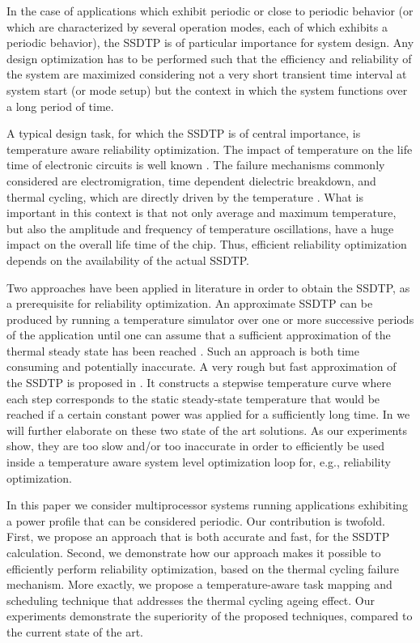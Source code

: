 In the case of applications which exhibit periodic or close to periodic behavior (or which are characterized by several operation modes, each of which exhibits a periodic behavior), the SSDTP is of particular importance for system design. Any design optimization has to be performed such that the efficiency and reliability of the system are maximized considering not a very short transient time interval at system start (or mode setup) but the context in which the system functions over a long period of time.

A typical design task, for which the SSDTP is of central importance, is temperature aware reliability optimization. The impact of temperature on the life time of electronic circuits is well known \cite{lu2004, srinivasan2004, coskun2006, xiang2010, jedec2010, hieu2004}. The failure mechanisms commonly considered are electromigration, time dependent dielectric breakdown, and thermal cycling, which are directly driven by the temperature \cite{jedec2010}. What is important in this context is that not only average and maximum temperature, but also the amplitude and frequency of temperature oscillations, have a huge impact on the overall life time of the chip. Thus, efficient reliability optimization depends on the availability of the actual SSDTP.

Two approaches have been applied in literature in order to obtain the SSDTP, as a prerequisite for reliability optimization. An approximate SSDTP can be produced by running a temperature simulator over one or more successive periods of the application until one can assume that a sufficient approximation of the thermal steady state has been reached \cite{srinivasan2004}. Such an approach is both time consuming and potentially inaccurate. A very rough but fast approximation of the SSDTP is proposed in \cite{huang2009}. It constructs a stepwise temperature curve where each step corresponds to the static steady-state temperature that would be reached if a certain constant power was applied for a sufficiently long time. In  we will further elaborate on these two state of the art solutions. As our experiments show, they are too slow and/or too inaccurate in order to efficiently be used inside a temperature aware system level optimization loop for, e.g., reliability optimization.

In this paper we consider multiprocessor systems running applications exhibiting a power profile that can be considered periodic. Our contribution is twofold. First, we propose an approach that is both accurate and fast, for the SSDTP calculation. Second, we demonstrate how our approach makes it possible to efficiently perform reliability optimization, based on the thermal cycling failure mechanism. More exactly, we propose a temperature-aware task mapping and scheduling technique that addresses the thermal cycling ageing effect. Our experiments demonstrate the superiority of the proposed techniques, compared to the current state of the art.

